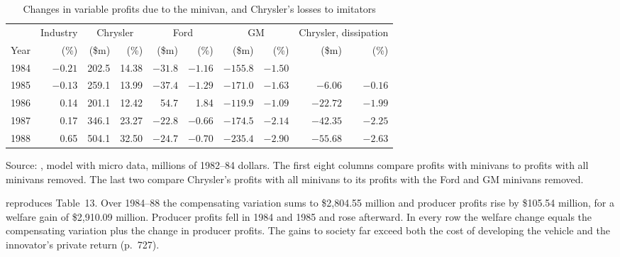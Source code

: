 \begin{table}[htbp]
\centering
\caption{Changes in variable profits due to the minivan, and Chrysler's losses to imitators}\label{tab:10-petrin-profits}
\small
\begin{tabular}{@{}lrrrrrrrrr@{}}
\toprule
 & Industry & \multicolumn{2}{c}{Chrysler} & \multicolumn{2}{c}{Ford} & \multicolumn{2}{c}{GM} &
 \multicolumn{2}{c}{Chrysler, dissipation} \\
\cmidrule(lr){3-4}\cmidrule(lr){5-6}\cmidrule(lr){7-8}\cmidrule(l){9-10}
Year & (\%) & (\$m) & (\%) & (\$m) & (\%) & (\$m) & (\%) & (\$m) & (\%) \\
\midrule
1984 & $-0.21$ & 202.5 & 14.38 & $-31.8$ & $-1.16$ & $-155.8$ & $-1.50$ &          &         \\
1985 & $-0.13$ & 259.1 & 13.99 & $-37.4$ & $-1.29$ & $-171.0$ & $-1.63$ & $-6.06$  & $-0.16$ \\
1986 & 0.14    & 201.1 & 12.42 & 54.7    & 1.84    & $-119.9$ & $-1.09$ & $-22.72$ & $-1.99$ \\
1987 & 0.17    & 346.1 & 23.27 & $-22.8$ & $-0.66$ & $-174.5$ & $-2.14$ & $-42.35$ & $-2.25$ \\
1988 & 0.65    & 504.1 & 32.50 & $-24.7$ & $-0.70$ & $-235.4$ & $-2.90$ & $-55.68$ & $-2.63$ \\
\bottomrule
\end{tabular}

\smallskip
\begin{minipage}{0.95\textwidth}
\footnotesize Source: \citet[Tables~11 and 12]{Petrin2002}, model with micro data, millions of 1982--84 dollars. The
first eight columns compare profits with minivans to profits with all minivans removed. The last two compare
Chrysler's profits with all minivans to its profits with the Ford and GM minivans removed.
\end{minipage}
\end{table}

  reproduces Table~13. Over 1984--88 the compensating variation
sums to \$2,804.55 million and producer profits rise by \$105.54 million, for a welfare gain of \$2,910.09 million.
Producer profits fell in 1984 and 1985 and rose afterward. In every row the welfare change equals the compensating
variation plus the change in producer profits. The gains to society far exceed both the cost of developing the vehicle
and the innovator's private return (p.~727).

